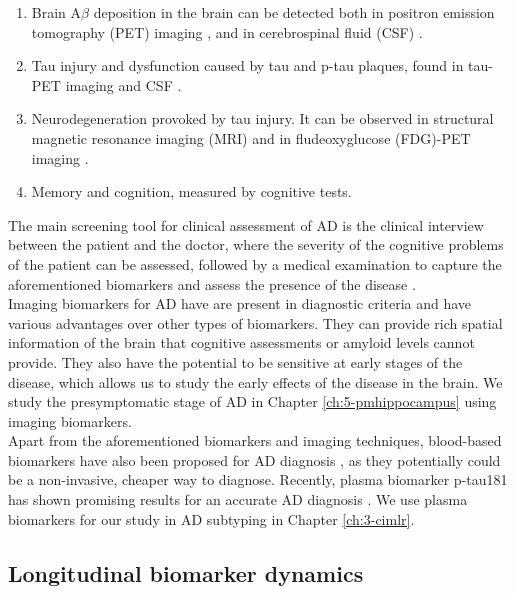 \begin{enumerate}\itemsep5pt
\item Brain A$\beta$ deposition in the brain can be detected both in positron emission tomography (PET) imaging \cite{Clark2011}, and in cerebrospinal fluid (CSF) \cite{Andreasen1999}.
\item Tau injury and dysfunction caused by tau and p-tau plaques, found in tau-PET imaging and CSF \cite{Andreasen1999,Blennow2010}.
\item Neurodegeneration provoked by tau injury. It can be observed in structural magnetic resonance imaging (MRI) \cite{Weiner2005} and in fludeoxyglucose (FDG)-PET imaging \cite{Chetelat2003}.
\item Memory and cognition, measured by cognitive tests.
\end{enumerate}

The main screening tool for clinical assessment of AD is the clinical interview between the patient and the doctor, where the severity of the cognitive problems of the patient can be assessed, followed by a medical examination to capture the aforementioned biomarkers and assess the presence of the disease \cite{Lane2018}. \\

Imaging biomarkers for AD have are present in diagnostic criteria \cite{Lane2018} and have various advantages over other types of biomarkers. They can provide rich spatial information of the brain that cognitive assessments or amyloid levels cannot provide. They also have the potential to be sensitive at early stages of the disease, which allows us to study the early effects of the disease in the brain. We study the presymptomatic stage of AD in Chapter \ref{ch:5-pmhippocampus} using imaging biomarkers.  \\

Apart from the aforementioned biomarkers and imaging techniques, blood-based biomarkers have also been proposed for AD diagnosis \cite{Shi2018}, as they potentially could be a non-invasive, cheaper way to diagnose. Recently, plasma biomarker p-tau181 has shown promising results for an accurate AD diagnosis \cite{Karikari2020,Karikari2020a,Moscoso2020}. We use plasma biomarkers for our study in AD subtyping in Chapter \ref{ch:3-cimlr}. \\

\subsection{Longitudinal biomarker dynamics}

